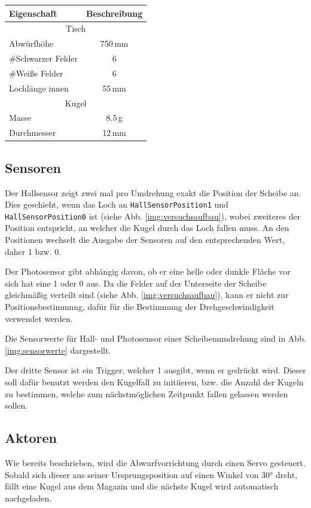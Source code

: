 \begin{center}
\begin{tabular}{lc} 
	\textbf{Eigenschaft} 	& \textbf{Beschreibung}	\\
	\toprule
	\multicolumn{2}{c}{Tisch}\\ 
	\midrule
	Abwürfhöhe 	& 750\,mm \\
	\#Schwarzer Felder 	& 6 \\
	\#Weiße Felder 	& 6 \\
	Lochlänge innen 	& 55\,mm \\
	\midrule 
	\multicolumn{2}{c}{Kugel}\\ 
	\midrule
	Masse 	& 8.5\,g \\
	Durchmesser 	& 12\,mm \\
	\bottomrule
\end{tabular}
\end{center}

\subsection{Sensoren}
Der Hallsensor zeigt zwei mal pro Umdrehung exakt die Position der Scheibe an.
Dies geschieht, wenn das Loch an \texttt{HallSensorPosition1} und \texttt{HallSensorPosition0} ist (siehe Abb. \ref{img:versuchsaufbau}), wobei zweiteres der Position entspricht, an welcher die Kugel durch das Loch fallen muss.
An den Positionen wechselt die Ausgabe der Sensoren auf den entsprechenden Wert, daher 1 bzw. 0.

Der Photosensor gibt abhängig davon, ob er eine helle oder dunkle Fläche vor sich hat eine 1 oder 0 aus.
Da die Felder auf der Unterseite der Scheibe gleichmäßig verteilt sind (siehe Abb. \ref{img:versuchsaufbau}), kann er nicht zur Positionsbestimmung, dafür für die Bestimmung der Drehgeschwindigkeit verwendet werden.

Die Sensorwerte für Hall- und Photosensor einer Scheibenumdrehung sind in Abb. \ref{img:sensorwerte} dargestellt.

Der dritte Sensor ist ein Trigger, welcher 1 ausgibt, wenn er gedrückt wird.
Dieser soll dafür benutzt werden den Kugelfall zu initiieren, bzw. die Anzahl der Kugeln zu bestimmen, welche zum nächstmöglichen Zeitpunkt fallen gelassen werden sollen.

\subsection{Aktoren}
\label{subs:aktoren}
Wie bereits beschrieben, wird die Abwurfvorrichtung durch einen Servo gesteuert.
Sobald sich dieser aus seiner Ursprungsposition auf einen Winkel von 30° dreht, fällt eine Kugel aus dem Magazin und die nächste Kugel wird automatisch nachgeladen.


